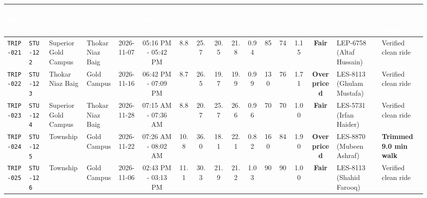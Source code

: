 \documentclass[9pt, a4paper, landscape]{article}
\begin{document}
\begin{table}[h!]
\centering
\fontsize{6.8pt}{8.5pt}\selectfont
\begin{tabularx}{\textwidth}{|l|l|p{2.2cm}|p{2.3cm}|c|c|c|c|c|c|c|c|c|c|c|p{3.1cm}|X|}
\hline
\rowcolor{navyblue}\textcolor{white}{\textbf{Trip ID}} & 
\textcolor{white}{\textbf{Student}} & 
\textcolor{white}{\textbf{Pickup}} & 
\textcolor{white}{\textbf{Dropoff}} & 
\textcolor{white}{\textbf{Date}} & 
\textcolor{white}{\textbf{Time Window}} & 
\textcolor{white}{\textbf{Dist}} & 
\textcolor{white}{\textbf{Time}} & 
\textcolor{white}{\textbf{Speed}} & 
\textcolor{white}{\textbf{Base}} & 
\textcolor{white}{\textbf{Pace}} & 
\textcolor{white}{\textbf{Fare}} & 
\textcolor{white}{\textbf{Std}} & 
\textcolor{white}{\textbf{Ratio}} & 
\textcolor{white}{\textbf{Rating}} & 
\textcolor{white}{\textbf{Vehicle (Driver)}} & 
\textcolor{white}{\textbf{Cleaning Action Applied}} \\ \hline
\rowcolor{white}\texttt{TRIP-021} & \texttt{STU-122} & Superior Gold Campus & Thokar Niaz Baig & 2026-11-07 & 05:16 PM - 05:42 PM & 8.8 & 25.7 & 20.5 & 21.8 & 0.94 & 85 & 74 & 1.15 & \textcolor{accentteal}{\textbf{Fair}} & LEP-6758 (Altaf Hussain) & \textcolor{slate}{Verified clean ride} \\ \hline
\rowcolor{lightgray}\texttt{TRIP-022} & \texttt{STU-123} & Thokar Niaz Baig & Gold Campus & 2026-11-16 & 06:42 PM - 07:09 PM & 8.7 & 26.5 & 19.7 & 19.9 & 0.99 & 130 & 76 & 1.71 & \textcolor{accentred}{\textbf{Overpriced}} & LES-8113 (Ghulam Mustafa) & \textcolor{slate}{Verified clean ride} \\ \hline
\rowcolor{white}\texttt{TRIP-023} & \texttt{STU-124} & Superior Gold Campus & Thokar Niaz Baig & 2026-11-28 & 07:15 AM - 07:36 AM & 8.8 & 20.7 & 25.7 & 26.6 & 0.96 & 70 & 70 & 1.00 & \textcolor{accentteal}{\textbf{Fair}} & LES-5731 (Irfan Haider) & \textcolor{slate}{Verified clean ride} \\ \hline
\rowcolor{lightgray}\texttt{TRIP-024} & \texttt{STU-125} & Township & Gold Campus & 2026-11-22 & 07:26 AM - 08:02 AM & 10.8 & 36.0 & 18.1 & 22.1 & 0.82 & 160 & 84 & 1.90 & \textcolor{accentred}{\textbf{Overpriced}} & LES-8870 (Mubeen Ashraf) & \textcolor{accentblue}{\textbf{Trimmed 9.0 min walk}} \\ \hline
\rowcolor{white}\texttt{TRIP-025} & \texttt{STU-126} & Township & Gold Campus & 2026-11-06 & 02:43 PM - 03:13 PM & 11.1 & 30.3 & 21.9 & 21.2 & 1.03 & 90 & 90 & 1.00 & \textcolor{accentteal}{\textbf{Fair}} & LES-8113 (Shahid Farooq) & \textcolor{slate}{Verified clean ride} \\ \hline

\end{tabularx}
\end{table}
\end{document}

